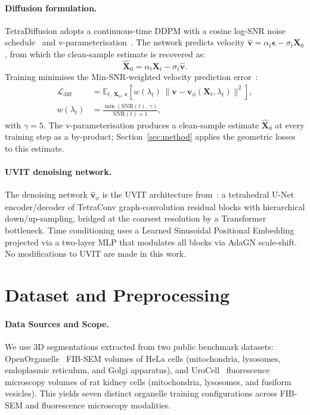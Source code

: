 \documentclass[10pt, a4paper, twocolumn]{article}
\begin{document}
\paragraph{Diffusion formulation.}
TetraDiffusion adopts a continuous-time DDPM with a cosine log-SNR noise schedule~\cite{kingma2021variational} and v-parameterisation~\cite{salimans2022progressive}. The network predicts velocity $\hat{\mathbf{v}} = \alpha_t \boldsymbol{\epsilon} - \sigma_t \mathbf{X}_0$, from which the clean-sample estimate is recovered as:
\begin{equation}
    \hat{\mathbf{X}}_0 = \alpha_t \mathbf{X}_t - \sigma_t \hat{\mathbf{v}}.
\end{equation}
Training minimises the Min-SNR-weighted velocity prediction error~\cite{hang2023efficient}:
\begin{equation}
\begin{split}
    \mathcal{L}_{\text{diff}} &= \mathbb{E}_{t,\, \mathbf{X}_0,\, \boldsymbol{\epsilon}} \!\left[ w(\lambda_t)\, \| \mathbf{v} - \hat{\mathbf{v}}_\phi(\mathbf{X}_t, \lambda_t) \|^2 \right], \\
    w(\lambda_t) &= \frac{\min(\text{SNR}(t),\, \gamma)}{\text{SNR}(t) + 1},
\end{split}
\end{equation}
with $\gamma = 5$. The v-parameterisation produces a clean-sample estimate $\hat{\mathbf{X}}_0$ at every training step as a by-product; Section~\ref{sec:method} applies the geometric losses to this estimate.

\paragraph{UVIT denoising network.}
The denoising network $\hat{\mathbf{v}}_\phi$ is the UVIT architecture from~\cite{kalischek2022tetradiffusion}: a tetrahedral U-Net encoder/decoder of TetraConv graph-convolution residual blocks with hierarchical down/up-sampling, bridged at the coarsest resolution by a Transformer bottleneck. Time conditioning uses a Learned Sinusoidal Positional Embedding projected via a two-layer MLP that modulates all blocks via AdaGN scale-shift. No modifications to UVIT are made in this work.

\section{Dataset and Preprocessing}
\label{sec:dataset}

\paragraph{Data Sources and Scope.}
We use 3D segmentations extracted from two public benchmark datasets: OpenOrganelle~\cite{heinrich2021whole} FIB-SEM volumes of HeLa cells (mitochondria, lysosomes, endoplasmic reticulum, and Golgi apparatus), and UroCell~\cite{matuszewski2020urocell} fluorescence microscopy volumes of rat kidney cells (mitochondria, lysosomes, and fusiform vesicles). This yields seven distinct organelle training configurations across FIB-SEM and fluorescence microscopy modalities.
\end{document}
